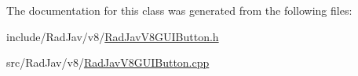 The documentation for this class was generated from the following files\+:\begin{DoxyCompactItemize}
\item 
include/\+Rad\+Jav/v8/\mbox{\hyperlink{_rad_jav_v8_g_u_i_button_8h}{Rad\+Jav\+V8\+G\+U\+I\+Button.\+h}}\item 
src/\+Rad\+Jav/v8/\mbox{\hyperlink{_rad_jav_v8_g_u_i_button_8cpp}{Rad\+Jav\+V8\+G\+U\+I\+Button.\+cpp}}\end{DoxyCompactItemize}
